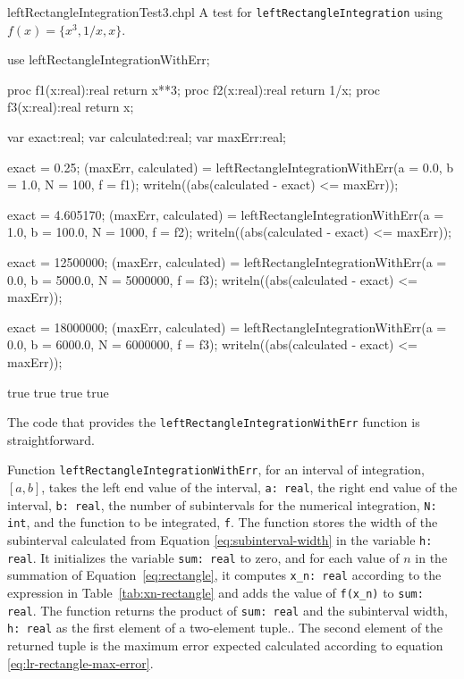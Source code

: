 \begin{chapelexample}{leftRectangleIntegrationTest3.chpl}
  A test for \lstinline{leftRectangleIntegration} using $f(x) = \{x^3, 1/x, x\}$.
  \begin{chapelpre}
  \end{chapelpre}
  \begin{chapel}
    use leftRectangleIntegrationWithErr;

    proc f1(x:real):real {
      return x**3;
    } 
    proc f2(x:real):real {
      return 1/x;
    } 
    proc f3(x:real):real {
      return x;
    } 

    var exact:real;
    var calculated:real;
    var maxErr:real;

    exact = 0.25;
    (maxErr, calculated) = leftRectangleIntegrationWithErr(a = 0.0, b = 1.0, N = 100, f = f1);
    writeln((abs(calculated - exact) <= maxErr));

    exact = 4.605170;
    (maxErr, calculated) = leftRectangleIntegrationWithErr(a = 1.0, b = 100.0, N = 1000, f = f2);
    writeln((abs(calculated - exact) <= maxErr));

    exact = 12500000;
    (maxErr, calculated) = leftRectangleIntegrationWithErr(a = 0.0, b = 5000.0, N = 5000000, f = f3);
    writeln((abs(calculated - exact) <= maxErr));

    exact = 18000000;
    (maxErr, calculated) = leftRectangleIntegrationWithErr(a = 0.0, b = 6000.0, N = 6000000, f = f3);
    writeln((abs(calculated - exact) <= maxErr));
  \end{chapel}
  \begin{chapelpost}
  \end{chapelpost}
  \begin{chapeloutput}
true
true
true
true
  \end{chapeloutput}
\end{chapelexample}

The code that provides the \lstinline{leftRectangleIntegrationWithErr} function is straightforward.
\begin{enumspec}
\item{} Function \lstinline{leftRectangleIntegrationWithErr}, for an interval
  of integration, $[a,b]$,
  takes the left end value of the interval, \lstinline{a: real}, the right end value
  of the interval, \lstinline{b: real}, the number of subintervals for the numerical
  integration, \lstinline{N: int}, and the function to be integrated, \lstinline{f}.
  The function stores the width of the subinterval calculated from Equation 
  \ref{eq:subinterval-width} in the variable \lstinline{h: real}. It initializes the variable
  \lstinline{sum: real} to zero, and for each value of $n$ in the summation of Equation~\ref{eq:rectangle},
  it computes \lstinline{x_n: real} according to the expression in Table~\ref{tab:xn-rectangle} and adds
  the value of \lstinline{f(x_n)} to \lstinline{sum: real}. The function returns the product of 
  \lstinline{sum: real} and the subinterval width, \lstinline{h: real} as the first element of a two-element
  tuple..
  The second element of the returned tuple is the
  maximum error expected calculated according to equation \ref{eq:lr-rectangle-max-error}.  
\end{enumspec}


